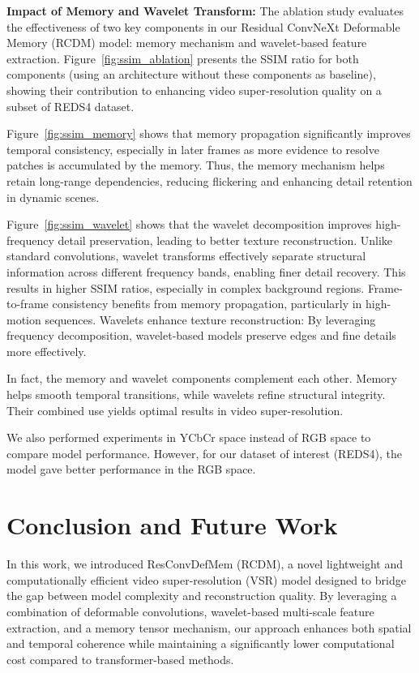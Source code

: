 \documentclass[11pt]{article}
\begin{document}
\textbf{Impact of Memory and Wavelet Transform:}
The ablation study evaluates the effectiveness of two key components in our Residual ConvNeXt Deformable Memory (RCDM) model: memory mechanism and wavelet-based feature extraction. Figure~\ref{fig:ssim_ablation} presents the SSIM ratio for both components (using an architecture without these components as baseline), showing their contribution to enhancing video super-resolution quality on a subset of REDS4 dataset.

Figure~\ref{fig:ssim_memory} shows that memory propagation significantly improves temporal consistency, especially in later frames as more evidence to resolve patches is accumulated by the memory. Thus, the memory mechanism helps retain long-range dependencies, reducing flickering and enhancing detail retention in dynamic scenes. 

Figure~\ref{fig:ssim_wavelet} shows that the wavelet decomposition improves high-frequency detail preservation, leading to better texture reconstruction. Unlike standard convolutions, wavelet transforms effectively separate structural information across different frequency bands, enabling finer detail recovery. This results in higher SSIM ratios, especially in complex background regions.
Frame-to-frame consistency benefits from memory propagation, particularly in high-motion sequences.
Wavelets enhance texture reconstruction: By leveraging frequency decomposition, wavelet-based models preserve edges and fine details more effectively.

In fact, the memory and wavelet components complement each other. Memory helps smooth temporal transitions, while wavelets refine structural integrity. Their combined use yields optimal results in video super-resolution.

We also performed experiments in YCbCr space instead of RGB space to compare model performance. However, for our dataset of interest (REDS4), the model gave better performance in the RGB space.

\section{Conclusion and Future Work}
\label{sec:conclusion}

In this work, we introduced ResConvDefMem (RCDM), a novel lightweight and computationally efficient video super-resolution (VSR) model designed to bridge the gap between model complexity and reconstruction quality. By leveraging a combination of deformable convolutions, wavelet-based multi-scale feature extraction, and a memory tensor mechanism, our approach enhances both spatial and temporal coherence while maintaining a significantly lower computational cost compared to transformer-based methods.
\end{document}
